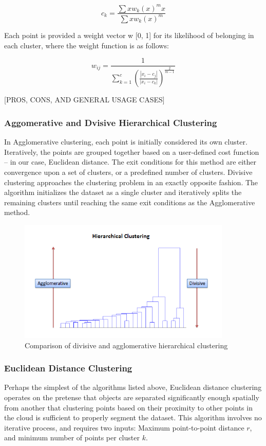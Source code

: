 \documentclass[12pt]{drexelthesis}
\let\Oldsubsubsection\subsubsection
\renewcommand{\subsubsection}{\FloatBarrier\Oldsubsubsection}
\begin{document}
\begin{equation}
	c_{k} = \frac{\sum{x}w_{k}(x)^{m}x}{\sum{x}w_{k}(x)^{m}}
\end{equation}

Each point is provided a weight vector w [0, 1] for its likelihood of belonging in each cluster, where the weight function is as follows:

\begin{equation}
	w_{ij} = \frac{1}{\sum_{k=1}^{c}(\frac{|x_{i}-c_{j}|}{|x_{i}-c_{k}|})^{\frac{2}{m-1}}}
\end{equation}

[PROS, CONS, AND GENERAL USAGE CASES]

\subsubsection{Aggomerative and Dvisive Hierarchical Clustering}
In Agglomerative clustering, each point is initially considered its own cluster. Iteratively, the points are grouped together based on a user-defined cost function – in our case, Euclidean distance. The exit conditions for this method are either convergence upon a set of clusters, or a predefined number of clusters.
Divisive clustering approaches the clustering problem in an exactly opposite fashion. The algorithm initializes the dataset as a single cluster and iteratively splits the remaining clusters until reaching the same exit conditions as the Agglomerative method.


\begin{figure}[!h]
\centering
\includegraphics[width=4in]{divisiveAgglomerative.png}
\caption[Comparison of divisive and agglomerative clustering methods]{Comparison of divisive and agglomerative hierarchical clustering}
\end{figure}


\subsubsection{Euclidean Distance Clustering}
Perhaps the simplest of the algorithms listed above, Euclidean distance clustering operates on the pretense that objects are separated significantly enough spatially from another that clustering points based on their proximity to other points in the cloud is sufficient to properly segment the dataset. This algorithm involves no iterative process, and requires two inputs: Maximum point-to-point distance $r$, and minimum number of points per cluster $k$.
\end{document}

